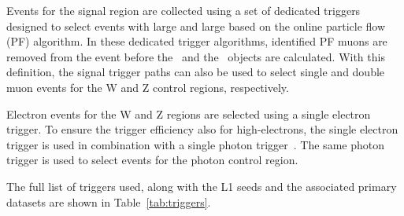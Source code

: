 Events for the signal region are collected using a set of dedicated
triggers designed to select events with large \ptmiss and large \mht based on
the online particle flow (PF) algorithm. In these dedicated trigger algorithms,
identified PF muons are removed from the event before the
\ptmiss~and the \mht~objects are calculated. With this definition, 
the signal trigger paths can also be used to select single and double muon events for the W and Z control regions, respectively.

Electron events for the W and Z regions are selected using a single electron trigger. 
To ensure the trigger efficiency also for high-\pt electrons, the single electron trigger is used in combination with 
a single photon trigger~\cite{CMS-EGM-TWIKI-HLT}. The same photon trigger is used to select events for the photon control region.

The full list of triggers used, along with the L1 seeds and the associated primary datasets are shown in Table~\ref{tab:triggers}.


